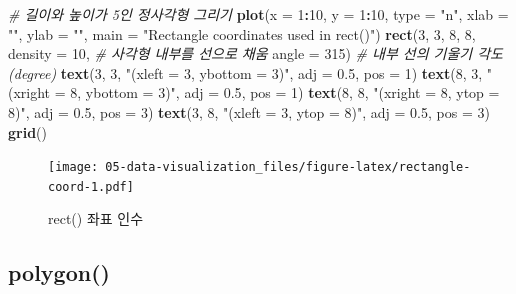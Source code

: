 \documentclass[
  11pt,
]{krantz}
\newenvironment{Shaded}{\begin{snugshade}}{\end{snugshade}}
\newcommand{\CommentTok}[1]{\textcolor[rgb]{0.37,0.37,0.37}{\textit{#1}}}
\newcommand{\DataTypeTok}[1]{\textcolor[rgb]{0.27,0.27,0.27}{#1}}
\newcommand{\DecValTok}[1]{\textcolor[rgb]{0.06,0.06,0.06}{#1}}
\newcommand{\FloatTok}[1]{\textcolor[rgb]{0.06,0.06,0.06}{#1}}
\newcommand{\KeywordTok}[1]{\textcolor[rgb]{0.27,0.27,0.27}{\textbf{#1}}}
\newcommand{\NormalTok}[1]{#1}
\newcommand{\OperatorTok}[1]{\textcolor[rgb]{0.43,0.43,0.43}{\textbf{#1}}}
\newcommand{\StringTok}[1]{\textcolor[rgb]{0.5,0.5,0.5}{#1}}
\begin{document}
\footnotesize

\begin{Shaded}
\begin{Highlighting}[]
\CommentTok{# 길이와 높이가 5인 정사각형 그리기}
\KeywordTok{plot}\NormalTok{(}\DataTypeTok{x =} \DecValTok{1}\OperatorTok{:}\DecValTok{10}\NormalTok{,}
     \DataTypeTok{y =} \DecValTok{1}\OperatorTok{:}\DecValTok{10}\NormalTok{,}
     \DataTypeTok{type =} \StringTok{"n"}\NormalTok{,}
     \DataTypeTok{xlab =} \StringTok{""}\NormalTok{, }\DataTypeTok{ylab =} \StringTok{""}\NormalTok{,}
     \DataTypeTok{main =} \StringTok{"Rectangle coordinates used in rect()"}\NormalTok{)}
\KeywordTok{rect}\NormalTok{(}\DecValTok{3}\NormalTok{, }\DecValTok{3}\NormalTok{, }\DecValTok{8}\NormalTok{, }\DecValTok{8}\NormalTok{,}
     \DataTypeTok{density =} \DecValTok{10}\NormalTok{, }\CommentTok{# 사각형 내부를 선으로 채움}
     \DataTypeTok{angle =} \DecValTok{315}\NormalTok{) }\CommentTok{# 내부 선의 기울기 각도(degree)}
\KeywordTok{text}\NormalTok{(}\DecValTok{3}\NormalTok{, }\DecValTok{3}\NormalTok{, }\StringTok{"(xleft = 3, ybottom = 3)"}\NormalTok{, }\DataTypeTok{adj =} \FloatTok{0.5}\NormalTok{,  }\DataTypeTok{pos =} \DecValTok{1}\NormalTok{)}
\KeywordTok{text}\NormalTok{(}\DecValTok{8}\NormalTok{, }\DecValTok{3}\NormalTok{, }\StringTok{"(xright = 8, ybottom = 3)"}\NormalTok{, }\DataTypeTok{adj =} \FloatTok{0.5}\NormalTok{, }\DataTypeTok{pos =} \DecValTok{1}\NormalTok{)}
\KeywordTok{text}\NormalTok{(}\DecValTok{8}\NormalTok{, }\DecValTok{8}\NormalTok{, }\StringTok{"(xright = 8, ytop = 8)"}\NormalTok{, }\DataTypeTok{adj =} \FloatTok{0.5}\NormalTok{, }\DataTypeTok{pos =} \DecValTok{3}\NormalTok{)}
\KeywordTok{text}\NormalTok{(}\DecValTok{3}\NormalTok{, }\DecValTok{8}\NormalTok{, }\StringTok{"(xleft = 3, ytop = 8)"}\NormalTok{, }\DataTypeTok{adj =} \FloatTok{0.5}\NormalTok{, }\DataTypeTok{pos =} \DecValTok{3}\NormalTok{)}
\KeywordTok{grid}\NormalTok{()}
\end{Highlighting}
\end{Shaded}

\begin{figure}
\centering
\texttt{[image: 05-data-visualization\_files/figure-latex/rectangle-coord-1.pdf]}
\caption{\label{fig:rectangle-coord}rect() 좌표 인수}
\end{figure}

\normalsize

\hypertarget{polygon}{%
\subsection{polygon()}\label{polygon}}
\end{document}
